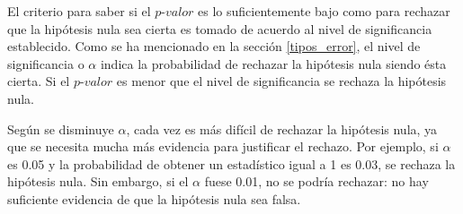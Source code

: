 El criterio para saber si el $\textit{p-valor}$ es lo suficientemente bajo como para rechazar que la hipótesis nula sea cierta
es tomado de acuerdo al nivel de significancia establecido. Como se ha mencionado en la sección \ref{tipos_error}, el
nivel de significancia o $\alpha$ indica la probabilidad de rechazar la hipótesis nula siendo ésta cierta. Si el
$\textit{p-valor}$ es menor que el nivel de significancia se rechaza la hipótesis nula.

Según se disminuye $\alpha$, cada vez es más difícil de rechazar la hipótesis nula, ya que se necesita mucha más
evidencia para justificar el rechazo. Por ejemplo, si $\alpha$ es 0.05 y la probabilidad de obtener un estadístico
igual a 1 es 0.03, se rechaza la hipótesis nula. Sin embargo, si el $\alpha$ fuese 0.01, no se podría rechazar: no hay suficiente evidencia de que la hipótesis nula sea falsa.


